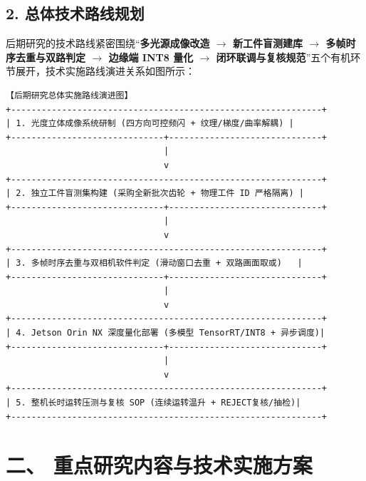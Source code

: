 \subsection*{2. 总体技术路线规划}
后期研究的技术路线紧密围绕“\textbf{多光源成像改造 $\rightarrow$ 新工件盲测建库 $\rightarrow$ 多帧时序去重与双路判定 $\rightarrow$ 边缘端 INT8 量化 $\rightarrow$ 闭环联调与复核规范}”五个有机环节展开，技术实施路线演进关系如图所示：

\begin{center}
\begin{minipage}{0.96\linewidth}
\begin{lstlisting}[basicstyle=\zihao{-5}\ttfamily, frame=single, rulecolor=\color{gray!40}, backgroundcolor=\color{gray!4}, captionpos=b, xleftmargin=0.5em, xrightmargin=0.5em]
                 【后期研究总体实施路线演进图】
+-------------------------------------------------------------+
| 1. 光度立体成像系统研制 (四方向可控频闪 + 纹理/梯度/曲率解耦) |
+------------------------------+------------------------------+
                               |
                               v
+-------------------------------------------------------------+
| 2. 独立工件盲测集构建 (采购全新批次齿轮 + 物理工件 ID 严格隔离) |
+------------------------------+------------------------------+
                               |
                               v
+-------------------------------------------------------------+
| 3. 多帧时序去重与双相机软件判定 (滑动窗口去重 + 双路画面取或)   |
+------------------------------+------------------------------+
                               |
                               v
+-------------------------------------------------------------+
| 4. Jetson Orin NX 深度量化部署 (多模型 TensorRT/INT8 + 异步调度)|
+------------------------------+------------------------------+
                               |
                               v
+-------------------------------------------------------------+
| 5. 整机长时运转压测与复核 SOP (连续运转温升 + REJECT复核/抽检)|
+-------------------------------------------------------------+
\end{lstlisting}
\end{minipage}
\end{center}

\section*{二、 重点研究内容与技术实施方案}


